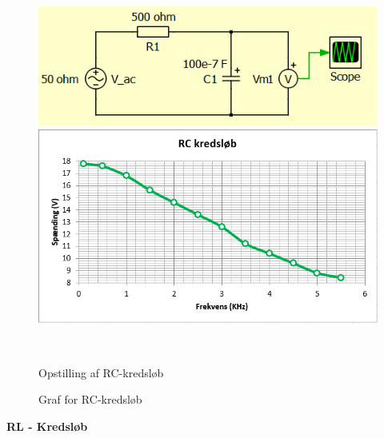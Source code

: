 \begin{figure}[H]
	\centering
	\begin{minipage}[b]{0.48\textwidth}
	\centering
	\includegraphics[width=1\textwidth]{Vildledning/Schematics/kredslb/RC} %
	\end{minipage}
	\hfill
	\begin{minipage}[b]{0.48\textwidth}
	\centering
	\includegraphics[width=1\textwidth]{Setup/Graf1} %
	\end{minipage}
	\\ %
	\begin{minipage}[t]{0.48\textwidth}
	\caption{Opstilling af RC-kredsløb} %
	\end{minipage}
	\hfill
	\begin{minipage}[t]{0.48\textwidth}
	\caption{Graf for RC-kredsløb} %
	\end{minipage}
\end{figure}
\newpage

\textbf{RL - Kredsløb}

